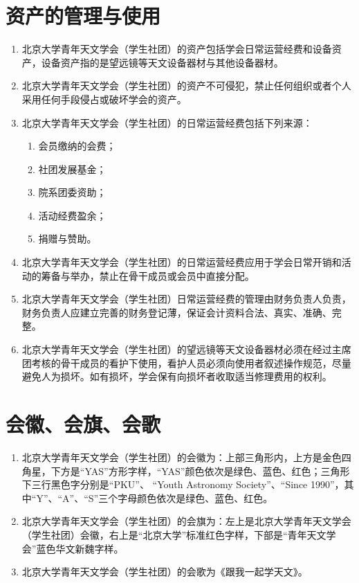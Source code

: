 \section{资产的管理与使用}

\begin{enumerate}[resume]
    \item 北京大学青年天文学会（学生社团）的资产包括学会日常运营经费和设备资产，设备资产指的是望远镜等天文设备器材与其他设备器材。
    
    \item 北京大学青年天文学会（学生社团）的资产不可侵犯，禁止任何组织或者个人采用任何手段侵占或破坏学会的资产。
    
    \item 北京大学青年天文学会（学生社团）的日常运营经费包括下列来源：
    
    \begin{enumerate}
        \item 会员缴纳的会费；
        \item 社团发展基金；
        \item 院系团委资助；
        \item 活动经费盈余；
        \item 捐赠与赞助。
    \end{enumerate}
    
    \item 北京大学青年天文学会（学生社团）的日常运营经费应用于学会日常开销和活动的筹备与举办，禁止在骨干成员或会员中直接分配。
    
    \item 北京大学青年天文学会（学生社团）日常运营经费的管理由财务负责人负责，财务负责人应建立完善的财务登记薄，保证会计资料合法、真实、准确、完整。
    
    \item 北京大学青年天文学会（学生社团）的望远镜等天文设备器材必须在经过主席团考核的骨干成员的看护下使用，看护人员必须向使用者叙述操作规范，尽量避免人为损坏。如有损坏，学会保有向损坏者收取适当修理费用的权利。
\end{enumerate}

\section{会徽、会旗、会歌}

\begin{enumerate}[resume]
    \item 北京大学青年天文学会（学生社团）的会徽为：上部三角形内，上方是金色四角星，下方是“YAS”方形字样，“YAS”颜色依次是绿色、蓝色、红色；三角形下三行黑色字分别是“PKU”、 “Youth Astronomy Society”、“Since 1990”，其中“Y”、“A”、“S”三个字母颜色依次是绿色、蓝色、红色。
    
    \item 北京大学青年天文学会（学生社团）的会旗为：左上是北京大学青年天文学会（学生社团）会徽，右上是“北京大学”标准红色字样，下部是“青年天文学会”蓝色华文新魏字样。
    
    \item 北京大学青年天文学会（学生社团）的会歌为《跟我一起学天文》。
\end{enumerate}

